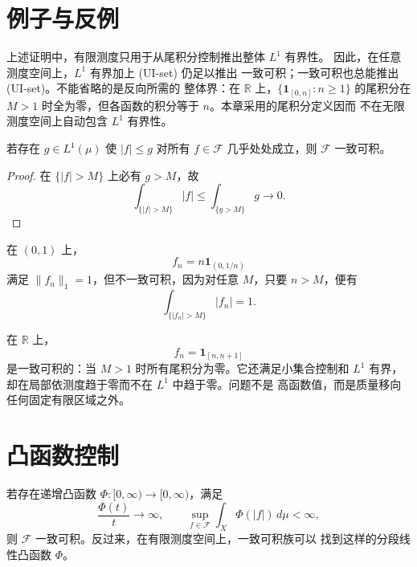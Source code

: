 \section{例子与反例}

上述证明中，有限测度只用于从尾积分控制推出整体 \(L^1\) 有界性。
因此，在任意测度空间上，\(L^1\) 有界加上 \textup{(UI-set)} 仍足以推出
一致可积；一致可积也总能推出 \textup{(UI-set)}。不能省略的是反向所需的
整体界：在 \(\mathbb R\) 上，\(\{\mathbf1_{[0,n]}:n\ge1\}\) 的尾积分在
\(M>1\) 时全为零，但各函数的积分等于 \(n\)。本章采用的尾积分定义因而
不在无限测度空间上自动包含 \(L^1\) 有界性。

\begin{proposition}
\label{prop:dominated-family-ui}
若存在 \(g\in L^1(\mu)\) 使 \(|f|\le g\) 对所有
\(f\in\mathcal F\) 几乎处处成立，则 \(\mathcal F\) 一致可积。
\end{proposition}

\begin{proof}
在 \(\{|f|>M\}\) 上必有 \(g>M\)，故
\[
 \int_{\{|f|>M\}}|f|
 \le\int_{\{g>M\}}g\longrightarrow0.
\]
\end{proof}

\begin{counterexample}[尖峰]
在 \((0,1)\) 上，
\[
 f_n=n\mathbf1_{(0,1/n)}
\]
满足 \(\|f_n\|_1=1\)，但不一致可积，因为对任意 \(M\)，只要
\(n>M\)，便有
\[
 \int_{\{|f_n|>M\}}|f_n|=1.
\]
\end{counterexample}

\begin{counterexample}[质量逃逸]
在 \(\mathbb R\) 上，
\[
 f_n=\mathbf1_{[n,n+1]}
\]
是一致可积的：当 \(M>1\) 时所有尾积分为零。它还满足小集合控制和
\(L^1\) 有界，却在局部依测度趋于零而不在 \(L^1\) 中趋于零。问题不是
高函数值，而是质量移向任何固定有限区域之外。
\end{counterexample}

\section{凸函数控制}

\begin{theorem}
\label{thm:de-la-vallee-poussin}
若存在递增凸函数 \(\Phi:[0,\infty)\to[0,\infty)\)，满足
\[
 \frac{\Phi(t)}t\longrightarrow\infty,
 \qquad
 \sup_{f\in\mathcal F}\int_X\Phi(|f|)\,d\mu<\infty,
\]
则 \(\mathcal F\) 一致可积。反过来，在有限测度空间上，一致可积族可以
找到这样的分段线性凸函数 \(\Phi\)。
\end{theorem}

